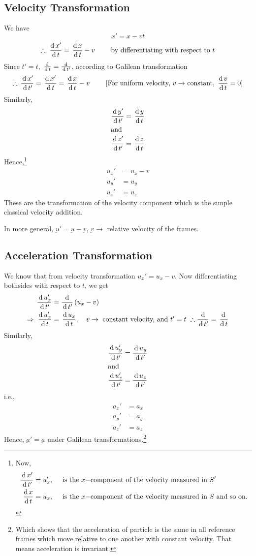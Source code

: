 \documentclass[../main-sheet.tex]{subfiles}
\begin{document}
\subsection{Velocity Transformation}
We have 
\[x'=x-vt \]
\[\therefore \,\,\frac{\mathrm{d}\,x'}{\mathrm{d}\,t}=\,\frac{\mathrm{d}\,x}{\mathrm{d}\,t}-v\qquad \text{ by differentiating with respect to  } t\]
Since \(t'=t \), \(\,\frac{\mathrm{d}\,}{\mathrm{d}\,t}=\frac{\,\mathrm{d}\, }{\,\mathrm{d}\, t'}\), \hspace{2cm} according to Galilean transformation
\[\therefore\, \frac{\,\mathrm{d}\, x'}{\,\mathrm{d}\, t' }=\,\frac{\mathrm{d}\,x'}{\mathrm{d}\,t}=\,\frac{\mathrm{d}\,x}{\mathrm{d}\,t}-v\qquad \text{ [For uniform velocity, \(v\to\) constant, \(\displaystyle\,\frac{\mathrm{d}\,v}{\mathrm{d}\,t}=0\)]}\]
Similarly,
\begin{align*}
    \frac{\,\mathrm{d}\, y'}{\,\mathrm{d}\, t'}&=\,\frac{\mathrm{d}\,y   }{\mathrm{d}\,t}\\
    \intertext{and}
    \frac{\,\mathrm{d}\, z'}{\,\mathrm{d}\, t'}&=\,\frac{\mathrm{d}\,z   }{\mathrm{d}\,t}
\end{align*}
Hence,\footnote{Now,
\begin{align*}
    \frac{\,\mathrm{d}\, x'}{\,\mathrm{d}\, t'}&=u_x',\quad \text{ is the \(x-\)component of the velocity measured in \(S'\)}\\
    \,\frac{\mathrm{d}\,x}{\mathrm{d}\,t}&=u_x,\quad \text{ is the \(x-\)component of the velocity measured in \(S\) and so on.}
\end{align*}}
\begin{align*}
    u_x'&=u_x-v\\
    u_y'&=u_y\\
    u_z'&=u_z
\end{align*}
These are the transformation of the velocity component which is the simple classical velocity addition.


In more general, \(\underbar{u }'=\underbar{u }-\underbar{v}\), \(\underbar{v}\to \) relative velocity of the frames.
\subsection{Acceleration Transformation}
We know that from velocity transformation \(u_x'=u_x-v \). Now differentiating bothsides with respect to \(t \), we get
\begin{align*}
    \frac{\,\mathrm{d}\, u_x'}{\,\mathrm{d}\, t'}&=\frac{\,\mathrm{d}\, }{\,\mathrm{d}\, t'}\left( u_x-v \right)\\
    \Rightarrow\,\,\frac{\mathrm{d}\,u_x'}{\mathrm{d}\,t}&=\,\frac{\mathrm{d}\,u_x}{\mathrm{d}\,t},\quad v\to\text{ constant velocity, and }t'=t\,\,\therefore \frac{\,\mathrm{d}\, }{\,\mathrm{d}\, t'}=\,\frac{\mathrm{d}\,}{\mathrm{d}\,t}
\end{align*}
Similarly,
\begin{align*}
    \frac{\,\mathrm{d}\, u_y'}{\,\mathrm{d}\, t'}&=\frac{\,\mathrm{d}\, u_y}{\,\mathrm{d}\, t'}\\
    \intertext{and}
    \frac{\,\mathrm{d}\, u_z'}{\,\mathrm{d}\, t'}&=\frac{\,\mathrm{d}\, u_z}{\,\mathrm{d}\, t'}
\end{align*}
i.e.,
\begin{align*}
    a_x'&=a_x\\
    a_y'&=a_y\\
    a_z'&=a_z
\end{align*}
Hence, \(\underbar{a}'=\underbar{a }\) under Galilean transformations.\footnote{Which shows that the acceleration of particle is the same in all reference frames which move relative to one another with constant velocity. That means acceleration is invariant.}
\end{document}
